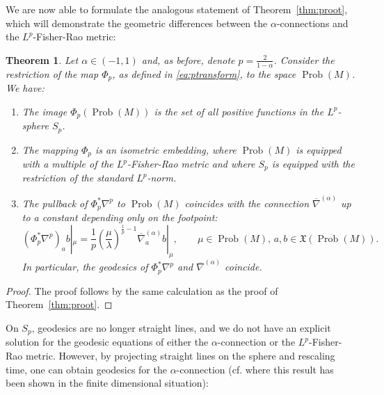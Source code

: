 \documentclass[11pt]{amsart}
\newtheorem{theorem}{Theorem}[section]
\theoremstyle{definition}
\newcommand{\dx}{\lambda}
\newcommand{\Prob}{\operatorname{Prob}(M)}
\newcommand{\Dens}{\operatorname{Dens}_+(M)}
\begin{document}
We are now able to formulate the analogous statement of Theorem~\ref{thm:proot}, which will demonstrate the geometric differences between the $\alpha$-connections and the $L^p$-Fisher-Rao metric: 
\begin{theorem}\label{thm:proot_Prob}
Let $\alpha\in (-1,1)$ and, as before, denote $p = \frac{2}{1-\alpha}$.
Consider the restriction of the map $\Phi_p$, as defined in
\eqref{eq:ptransform}, to the space $\Prob$.
We have:
\begin{enumerate}[label=(\alph*)]
\item The image $\Phi_p(\Prob)$  is 
the set of all positive functions in the $L^p$-sphere $S_p$. 
\item \label{proot_FR_Prob} The mapping $\Phi_p$  
is an isometric embedding, where $\Prob$ is equipped with a multiple of the $L^p$-Fisher-Rao metric and where $S_p$ is equipped with the restriction of the standard $L^p$-norm.
\item \label{proot_alphaCon_Prob}
The pullback of $\Phi_p^*\nabla^p$ to $\Prob$ coincides with the connection $\overline{\nabla}^{(\alpha)}$ up to a constant depending only on the footpoint:
\[
(\Phi_p^*\nabla^p)_a b|_\mu = \frac{1}{p}\left(\frac{\mu}{\dx}\right)^{\frac{1}{p}-1} \overline{\nabla}^{(\alpha)}_a b|_\mu,
\qquad \mu\in \Prob, \, a,b\in \mathfrak{X}(\Prob).
\]
In particular, the geodesics of $\Phi_p^*\nabla^p$ and $\overline{\nabla}^{(\alpha)}$ coincide.
\end{enumerate}
\end{theorem}
\begin{proof}
The proof follows by the same calculation as the proof of Theorem~\ref{thm:proot}.
\end{proof}
On $S_p$, geodesics are no longer straight lines, and we do not have an explicit solution for the geodesic equations of either the $\alpha$-connection or the $L^p$-Fisher-Rao metric. 
However, by projecting straight lines on the sphere and rescaling time, one can obtain geodesics for the $\alpha$-connection (cf. \cite[Section~2.5.2]{ay2015information} where this result has been shown in the finite dimensional situation):
\end{document}

